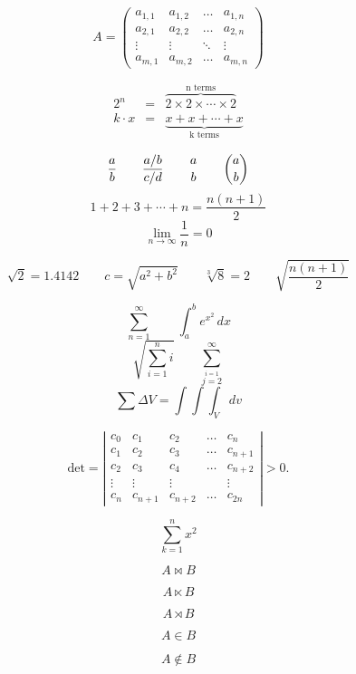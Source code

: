 \documentclass{article}
\begin{document}
\begin{equation}
A = \left(
\begin{array}{cccc}
a_{1,1} & a_{1,2} & \ldots & a_{1,n} \\
a_{2,1} & a_{2,2} & \ldots & a_{2,n} \\
\vdots & \vdots & \ddots & \vdots \\
a_{m,1} & a_{m,2} & \ldots & a_{m,n}
\end{array}
\right)
\end{equation}




\begin{eqnarray*}
2^n & = &\overbrace{2\times2\times\cdots\times 2}^{\mbox{n terms}}\\
k\cdot x & = &\underbrace{x + x + \cdots + x}_{\mbox{k terms}}
\end{eqnarray*}



$$ \frac{a}{b} \qquad \frac{a/b}{c/d}
\qquad {a\atop b} \qquad {a\choose b} $$
$$ 1 + 2 + 3 + \cdots + n = \frac{n(n+1)}{2} $$
$$ \lim_{n\rightarrow\infty}\frac{1}{n}=0
 $$



$$ \sqrt{2}=1.4142 \qquad c=\sqrt{a^2+b^2}
\qquad \sqrt[3]{8}=2 \qquad \sqrt{\frac{n(n+1)}{2}} $$



$$\sum^{\infty}_{n=1} \qquad \int^b_a e^{x^2}\,dx $$
$$\sqrt{\sum_{i=1}^{n}i} \qquad \sum_{\stackrel{i=1}{j=2}}^{\infty}$$
$$\sum \Delta V=\int\!\!\!\int\!\!\!\int_V dv $$






\[
\mbox{det} = \left|
\begin{array}{lllll}
c_0 & c_1 & c_2 & \ldots & c_n \\
c_1 & c_2 & c_3 & \ldots & c_{n+1} \\
c_2 & c_3 & c_4 & \ldots & c_{n+2} \\
\vdots & \vdots & \vdots && \vdots \\
c_n & c_{n+1} & c_{n+2} & \ldots & c_{2n}
\end{array}
\right| > 0.
\]


$$
\sum_{k=1}^{n}{x^{2}}
$$

$$
A \bowtie B
$$

$$
A \ltimes B
$$


$$
A \rtimes B
$$

$$
A \in B
$$

$$
A \notin B
$$
\end{document}
